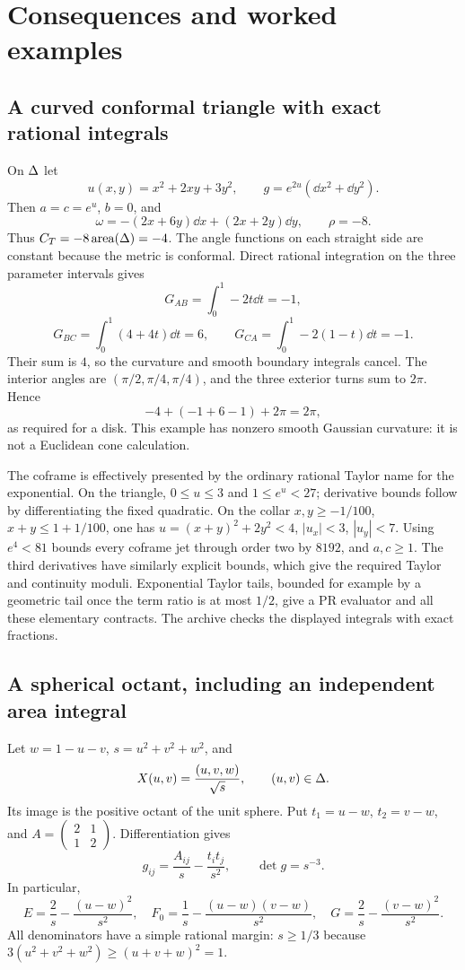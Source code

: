 \section{Consequences and worked examples}\label{sec:examples}

\subsection{A curved conformal triangle with exact rational integrals}

On $\Delta$ let
\[
u(x,y)=x^2+2xy+3y^2,\qquad
g=e^{2u}(\dd x^2+\dd y^2).
\]
Then $a=c=e^u$, $b=0$, and
\[
\omega=-(2x+6y)\dd x+(2x+2y)\dd y,
\qquad \rho=-8.
\]
Thus $C_T=-8\operatorname{area}(\Delta)=-4$.
The angle functions on each straight side are constant because the metric is conformal. Direct rational integration on the three parameter intervals gives
\[
G_{AB}=\int_0^1-2t\dd t=-1,
\]
\[
G_{BC}=\int_0^1(4+4t)\dd t=6,
\qquad
G_{CA}=\int_0^1-2(1-t)\dd t=-1.
\]
Their sum is $4$, so the curvature and smooth boundary integrals cancel. The interior angles are $(\pi/2,\pi/4,\pi/4)$, and the three exterior turns sum to $2\pi$. Hence
\[
-4+(-1+6-1)+2\pi=2\pi,
\]
as required for a disk. This example has nonzero smooth Gaussian curvature: it is not a Euclidean cone calculation.

The coframe is effectively presented by the ordinary rational Taylor name for the exponential. On the triangle, $0\le u\le3$ and $1\le e^u<27$; derivative bounds follow by differentiating the fixed quadratic. On the collar
$x,y\ge-1/100$, $x+y\le1+1/100$, one has
$u=(x+y)^2+2y^2<4$, $|u_x|<3$, $|u_y|<7$.
Using $e^4<81$ bounds every coframe jet through order two by $8192$, and $a,c\ge1$. The third derivatives have similarly explicit bounds, which give the required Taylor and continuity moduli. Exponential Taylor tails, bounded for example by a geometric tail once the term ratio is at most $1/2$, give a PR evaluator and all these elementary contracts. The archive checks the displayed integrals with exact fractions.

\subsection{A spherical octant, including an independent area integral}

Let $w=1-u-v$, $s=u^2+v^2+w^2$, and
\[
X(u,v)=\frac{(u,v,w)}{\sqrt s},\qquad (u,v)\in\Delta.
\]
Its image is the positive octant of the unit sphere. Put
$t_1=u-w$, $t_2=v-w$, and
$A=\left(\begin{smallmatrix}2&1\\1&2\end{smallmatrix}\right)$.
Differentiation gives
\begin{equation}\label{eq:spheremetric}
g_{ij}=\frac{A_{ij}}s-\frac{t_it_j}{s^2},
\qquad \det g=s^{-3}.
\end{equation}
In particular,
\[
E=\frac2s-\frac{(u-w)^2}{s^2},\quad
F_0=\frac1s-\frac{(u-w)(v-w)}{s^2},\quad
G=\frac2s-\frac{(v-w)^2}{s^2}.
\]
All denominators have a simple rational margin: $s\ge1/3$ because
$3(u^2+v^2+w^2)\ge(u+v+w)^2=1$.

